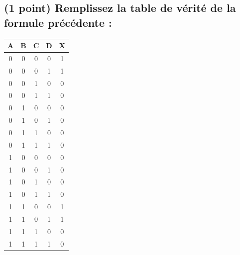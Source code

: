 \documentclass[11pt,a4paper]{article}
\begin{document}
\begin{table}[!ht]
  \centering
  \begin{minipage}{0.50\textwidth}
    \centering

\subsection{(1 point) Remplissez la table de vérité de la formule précédente : }

\bigskip

\begin{center}
\begin{tabular}{|c|c|c|c||c|}
\hline
\cellcolor{black!15} \textbf{A} & \cellcolor{black!15} \textbf{B} & \cellcolor{black!15} \textbf{C} & \cellcolor{black!15} \textbf{D}  &  \cellcolor{black!15} \textbf{X} \\
\hline
\hline
0 & 0 & 0 & 0  &  \cellcolor{black!15} 1 \\ \hline
0 & 0 & 0 & 1  &  \cellcolor{black!15} 1 \\ \hline
0 & 0 & 1 & 0  &  \cellcolor{black!15} 0 \\ \hline
0 & 0 & 1 & 1  &  \cellcolor{black!15} 0 \\ \hline
0 & 1 & 0 & 0  &  \cellcolor{black!15} 0 \\ \hline
0 & 1 & 0 & 1  &  \cellcolor{black!15} 0 \\ \hline
0 & 1 & 1 & 0  &  \cellcolor{black!15} 0 \\ \hline
0 & 1 & 1 & 1  &  \cellcolor{black!15} 0 \\ \hline
1 & 0 & 0 & 0  &  \cellcolor{black!15} 0 \\ \hline
1 & 0 & 0 & 1  &  \cellcolor{black!15} 0 \\ \hline
1 & 0 & 1 & 0  &  \cellcolor{black!15} 0 \\ \hline
1 & 0 & 1 & 1  &  \cellcolor{black!15} 0 \\ \hline
1 & 1 & 0 & 0  &  \cellcolor{black!15} 1 \\ \hline
1 & 1 & 0 & 1  &  \cellcolor{black!15} 1 \\ \hline
1 & 1 & 1 & 0  &  \cellcolor{black!15} 0 \\ \hline
1 & 1 & 1 & 1  &  \cellcolor{black!15} 0 \\ \hline
\end{tabular}
\end{center}

  \end{minipage}
  \hfillx
  \begin{minipage}{0.50\textwidth}


\end{minipage}
\end{table}
\end{document}
